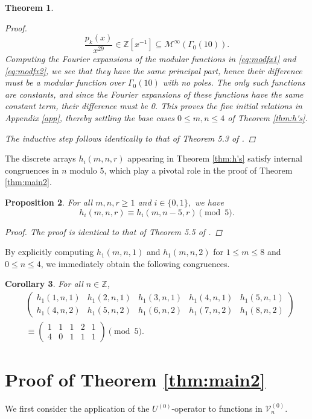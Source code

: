 \documentclass[12pt, reqno]{amsart}
\newtheorem{thm}{Theorem}[section]
\newtheorem{prop}[thm]{Proposition}
\newtheorem{cor}[thm]{Corollary}
\theoremstyle{definition}
\theoremstyle{remark}
\newcommand{\ZZ}{\mathbb{Z}}
\begin{document}
\begin{thm}
\begin{proof}
\begin{equation}
\frac{p_k(x)}{x^{29}} \in \mathbb{Z}[x^{-1}] \subseteq \mathcal{M}^\infty(\Gamma_0(10)).
\end{equation}
Computing the Fourier expansions of the modular functions in \eqref{eq:modfx1} and \eqref{eq:modfx2}, we see that they have the same principal part, hence their difference must be a modular function over $\Gamma_0(10)$ with no poles. The only such functions are constants, and since the Fourier expansions of these functions have the same constant term, their difference must be 0. This proves the five initial relations in Appendix \ref{app}, thereby settling the base cases $0 \leq m, n \leq 4$ of Theorem \ref{thm:h's}. 

The inductive step follows identically to that of Theorem 5.3 of \cite{BS}.
\end{proof}
\end{thm}

The discrete arrays $h_i(m,n,r)$ appearing in Theorem \ref{thm:h's} satisfy internal congruences in $n$ modulo 5, which play a pivotal role in the proof of Theorem \ref{thm:main2}. 

\begin{prop}\label{prop:h_cong}
For all $m,n,r \geq 1$ and $i \in \{0,1\},$ we have
\[h_i(m,n,r) \equiv h_i(m,n-5,r) \pmod{5}.\]
\begin{proof}
The proof is identical to that of Theorem 5.5 of \cite{BS}.
\end{proof}
\end{prop}

By explicitly computing $h_1(m,n,1)$ and $h_1(m,n,2)$ for $1 \leq m \leq 8$ and $0 \leq n \leq 4$, we immediately obtain the following congruences. 

\begin{cor}\label{cor:h_cor}
For all $n \in \ZZ$, 
\begin{align*}
&\begin{pmatrix} h_1(1,n,1) & h_1(2,n,1) & h_1(3,n,1) & h_1(4,n,1) & h_1(5,n,1) \\ h_1(4,n,2) & h_1(5,n,2) & h_1(6,n,2) & h_1(7,n,2) & h_1(8,n,2) \end{pmatrix} \\
&\equiv \begin{pmatrix} 1 & 1 & 1 & 2 & 1 \\ 4 & 0 & 1 & 1 & 1 \end{pmatrix} \pmod{5}.
\end{align*}
\end{cor}


\section{Proof of Theorem \ref{thm:main2}}\label{sec:proof}
We first consider the application of the $U^{(0)}$-operator to functions in $\mathcal{V}_{n}^{(0)}.$
\end{document}

